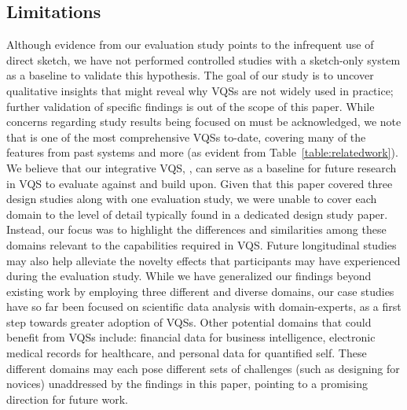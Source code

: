  \subsection{Limitations}%
 \par Although evidence from our evaluation study points to the infrequent use of direct sketch, we have not performed controlled studies with a sketch-only system as a baseline to validate this hypothesis.  The goal of our study is to uncover qualitative insights that might reveal why VQSs are not widely used in practice; further validation of specific findings is out of the scope of this paper. While concerns regarding study results being focused on \zvpp must be acknowledged, we note that \zvpp is one of the most comprehensive VQSs to-date, covering many of the features from past systems and more (as evident from Table~\ref{table:relatedwork}). We believe that our integrative VQS, \zvpp, can serve as a baseline for future research in VQS to evaluate against and build upon. Given that this paper covered three design studies along with one evaluation study, we were unable to cover each domain to the level of detail typically found in a dedicated design study paper. Instead, our focus was to highlight the differences and similarities among these domains relevant to the capabilities required in VQS. Future longitudinal studies may also help alleviate the novelty effects that participants may have experienced during the evaluation study. While we have generalized our findings beyond existing work by employing three different and diverse domains,
 our case studies have so far
 been focused on scientific data analysis with domain-experts,
 as a first step towards greater adoption of VQSs.
 Other potential domains that could benefit from VQSs include:
 financial data for business intelligence,
 electronic medical records for healthcare,
 and personal data for quantified self.
 These different domains may each pose different sets of challenges (such as designing for novices) unaddressed by the findings in this paper,
  pointing to a promising direction for future work.